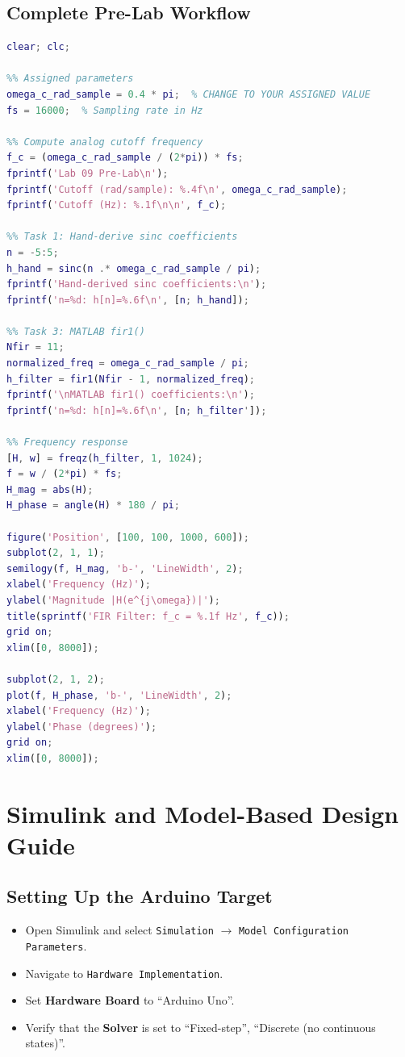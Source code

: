 \documentclass[11pt,letterpaper]{article}
\begin{document}
\subsection{Complete Pre-Lab Workflow}

\begin{lstlisting}[language=MATLAB, basicstyle=\ttfamily\small]
%% Lab 09 Pre-Lab: FIR Filter Design
clear; clc;

%% Assigned parameters
omega_c_rad_sample = 0.4 * pi;  % CHANGE TO YOUR ASSIGNED VALUE
fs = 16000;  % Sampling rate in Hz

%% Compute analog cutoff frequency
f_c = (omega_c_rad_sample / (2*pi)) * fs;
fprintf('Lab 09 Pre-Lab\n');
fprintf('Cutoff (rad/sample): %.4f\n', omega_c_rad_sample);
fprintf('Cutoff (Hz): %.1f\n\n', f_c);

%% Task 1: Hand-derive sinc coefficients
n = -5:5;
h_hand = sinc(n .* omega_c_rad_sample / pi);
fprintf('Hand-derived sinc coefficients:\n');
fprintf('n=%d: h[n]=%.6f\n', [n; h_hand]);

%% Task 3: MATLAB fir1()
Nfir = 11;
normalized_freq = omega_c_rad_sample / pi;
h_filter = fir1(Nfir - 1, normalized_freq);
fprintf('\nMATLAB fir1() coefficients:\n');
fprintf('n=%d: h[n]=%.6f\n', [n; h_filter']);

%% Frequency response
[H, w] = freqz(h_filter, 1, 1024);
f = w / (2*pi) * fs;
H_mag = abs(H);
H_phase = angle(H) * 180 / pi;

figure('Position', [100, 100, 1000, 600]);
subplot(2, 1, 1);
semilogy(f, H_mag, 'b-', 'LineWidth', 2);
xlabel('Frequency (Hz)');
ylabel('Magnitude |H(e^{j\omega})|');
title(sprintf('FIR Filter: f_c = %.1f Hz', f_c));
grid on;
xlim([0, 8000]);

subplot(2, 1, 2);
plot(f, H_phase, 'b-', 'LineWidth', 2);
xlabel('Frequency (Hz)');
ylabel('Phase (degrees)');
grid on;
xlim([0, 8000]);
\end{lstlisting}

\section{Simulink and Model-Based Design Guide}

\subsection{Setting Up the Arduino Target}

\begin{itemize}
    \item Open Simulink and select \texttt{Simulation} $\to$ \texttt{Model Configuration Parameters}.
    \item Navigate to \texttt{Hardware Implementation}.
    \item Set \textbf{Hardware Board} to ``Arduino Uno''.
    \item Verify that the \textbf{Solver} is set to ``Fixed-step'', ``Discrete (no continuous states)''.
\end{itemize}
\end{document}
